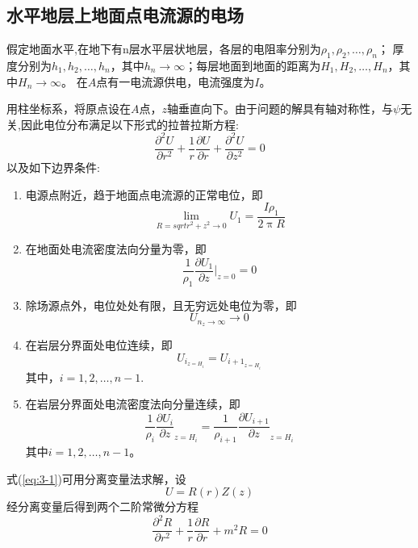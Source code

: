 \documentclass[hyperref,UTF-8,twoside]{ctexart}
\numberwithin{equation}{section}
\begin{document}
\subsection{水平地层上地面点电流源的电场}
假定地面水平,在地下有n层水平层状地层，各层的电阻率分别为$\rho_1,\rho_2,\ldots,\rho_n$；
厚度分别为$h_1,h_2,\ldots,h_n$，其中$h_n\to\infty$；每层地面到地面的距离为$H_1,H_2,\ldots,H_n$，其中$H_n\to\infty$。
在$A$点有一电流源供电，电流强度为$I$。

用柱坐标系，将原点设在$A$点，$z$轴垂直向下。由于问题的解具有轴对称性，与$\psi$无关,因此电位分布满足以下形式的拉普拉斯方程:
\begin{equation}
\frac {\partial^2U} {\partial{r^2}} +\frac{1}{r}\frac{\partial{U}} {\partial{r}}+\frac {\partial^2U} {\partial{z^2}}=0\label{eq:3-1}
\end{equation}
以及如下边界条件:
\begin{enumerate}
\item 电源点附近，趋于地面点电流源的正常电位，即
\begin{equation}
\lim_{R=sqrt{r^2+z^2}\to0}U_1=\frac{I\rho_1}{2\uppi{R}}\label{eq:3-2}
\end{equation}
\item 在地面处电流密度法向分量为零，即
\begin{equation}
\frac{1}{\rho_1}\frac{\partial{U_1}}{\partial{z}}\Bigg\vert_{z=0}=0\label{eq:3-3}
\end{equation}
\item 除场源点外，电位处处有限，且无穷远处电位为零，即
\begin{equation}
U_{{n_z}\to\infty}\to0
\end{equation}
\item 在岩层分界面处电位连续，即
\begin{equation}
U_{i_{z=H_i}}=U_{{i+1}_{z=H_i}}\label{eq:3-4}
\end{equation}
其中，$i=1,2,\ldots,n-1$.
\item 在岩层分界面处电流密度法向分量连续，即
\begin{equation}
\frac{1}{\rho_i}\frac{\partial{U_i}}{\partial z}_{z=H_i}=\frac{1}{\rho_{i+1}}\frac{\partial{U_{i+1}}}{\partial z}_{z=H_i}\label{eq:3-5}
\end{equation}
其中$i=1,2,\ldots,n-1$。
\end{enumerate}
式(\ref{eq:3-1})可用分离变量法求解，设
\begin{equation}
U=R(r)Z(z)\label{eq:3-6}
\end{equation}
经分离变量后得到两个二阶常微分方程
\begin{equation}
\frac{\partial^2{R}}{\partial{r^2}}+\frac{1}{r}\frac{\partial{R}}{\partial r}+m^2R=0\label{eq:3-7}
\end{equation}
\end{document}
